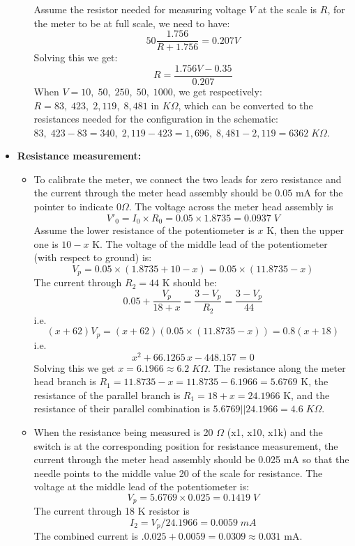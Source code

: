 \begin{itemize}
\begin{itemize}
    Assume the resistor needed for measuring voltage $V$ at the scale is $R$, for 
    the meter to be at full scale, we need to have:
    \[ 50 \frac{1.756}{R+1.756}=0.207V \]
    Solving this we get:
    \[ R=\frac{1.756V-0.35}{0.207} \]
    When $V=10,\;50,\;250,\;50,\;1000$, we get respectively:
    $R=83,\;423,\;2,119,\;8,481$ in $K\Omega$, which can be converted to the 
    resistances needed for the configuration in the schematic:
    $83,\;423-83=340,\;2,119-423=1,696,\;8,481-2,119=6362\;K\Omega$.

  \end{itemize}

\item {\bf Resistance measurement:}

  \begin{itemize}
  \item To calibrate the meter, we connect the two leads for zero resistance 
  and the current through the meter head assembly should be $0.05$ mA for 
  the pointer to indicate $0 \Omega$.
  The voltage across the meter head assembly is
  \[ V'_0=I_0\times R_0=0.05\times 1.8735=0.0937\;V \]
  Assume the lower resistance of the potentiometer is $x$ K, then the upper 
  one is $10-x$ K. 
  The voltage of the middle lead of the potentiometer (with respect to ground) is:
  \[ V_p=0.05\times (1.8735+10-x)=0.05\times (11.8735-x)  \]
  The current through $R_2=44$ K should be:
  \[ 0.05+\frac{V_p}{18+x}=\frac{3-V_p}{R_2}=\frac{3-V_p}{44} \]
  i.e.
  \[ (x+62)V_p=(x+62)(0.05\times (11.8735-x))=0.8(x+18) \]
  i.e.
  \[ x^2+66.1265\,x-448.157=0 \]
  Solving this we get $x=6.1966\approx 6.2\;K\Omega$.
  The resistance along the meter head branch is $R_1=11.8735-x=11.8735-6.1966=5.6769$ K,
  the resistance of the parallel branch is $R_1=18+x=24.1966$ K, and the resistance
  of their parallel combination is $5.6769||24.1966=4.6\; K\Omega$.
  

\item When the resistance being measured is 20 $\Omega$ (x1, x10, x1k) and the 
  switch is at the corresponding position for resistance measurement, the current 
  through the meter head assembly should be 0.025 mA so that the needle points to
  the middle value 20 of the scale for resistance. The voltage at the middle lead 
  of the potentiometer is:
  \[ V_p=5.6769\times 0.025=0.1419\;V \]
  The current through 18 K resistor is
  \[ I_2=V_p/24.1966=0.0059\;mA \]
  The combined current is $.0.025+0.0059=0.0309\approx 0.031$ mA.


\end{itemize}
\end{itemize}
